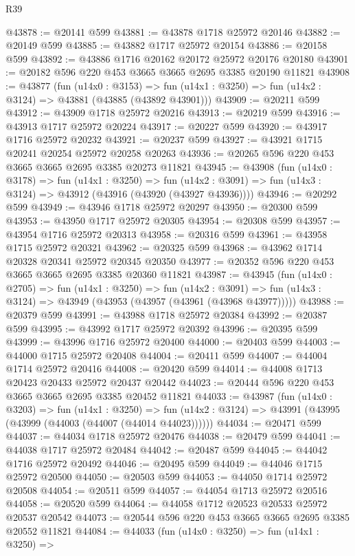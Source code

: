 \begin{lexlean}{R39}
\begin{coremodule}
@43878 := @20141 @599
@43881 := @43878 @1718 @25972 @20146
@43882 := @20149 @599
@43885 := @43882 @1717 @25972 @20154
@43886 := @20158 @599
@43892 := @43886 @1716 @20162 @20172 @25972 @20176 @20180
@43901 := @20182 @596 @220 @453 @3665 @3665 @2695 @3385 @20190 @11821
@43908 := @43877
    (fun (u14x0 : @3153) =>
    fun (u14x1 : @3250) => fun (u14x2 : @3124) => @43881 (@43885 (@43892 @43901)))
@43909 := @20211 @599
@43912 := @43909 @1718 @25972 @20216
@43913 := @20219 @599
@43916 := @43913 @1717 @25972 @20224
@43917 := @20227 @599
@43920 := @43917 @1716 @25972 @20232
@43921 := @20237 @599
@43927 := @43921 @1715 @20241 @20254 @25972 @20258 @20263
@43936 := @20265 @596 @220 @453 @3665 @3665 @2695 @3385 @20273 @11821
@43945 := @43908
    (fun (u14x0 : @3178) =>
    fun (u14x1 : @3250) =>
    fun (u14x2 : @3091) => fun (u14x3 : @3124) => @43912 (@43916 (@43920 (@43927 @43936))))
@43946 := @20292 @599
@43949 := @43946 @1718 @25972 @20297
@43950 := @20300 @599
@43953 := @43950 @1717 @25972 @20305
@43954 := @20308 @599
@43957 := @43954 @1716 @25972 @20313
@43958 := @20316 @599
@43961 := @43958 @1715 @25972 @20321
@43962 := @20325 @599
@43968 := @43962 @1714 @20328 @20341 @25972 @20345 @20350
@43977 := @20352 @596 @220 @453 @3665 @3665 @2695 @3385 @20360 @11821
@43987 := @43945
    (fun (u14x0 : @2705) =>
    fun (u14x1 : @3250) =>
    fun (u14x2 : @3091) => fun (u14x3 : @3124) => @43949 (@43953 (@43957 (@43961 (@43968 @43977)))))
@43988 := @20379 @599
@43991 := @43988 @1718 @25972 @20384
@43992 := @20387 @599
@43995 := @43992 @1717 @25972 @20392
@43996 := @20395 @599
@43999 := @43996 @1716 @25972 @20400
@44000 := @20403 @599
@44003 := @44000 @1715 @25972 @20408
@44004 := @20411 @599
@44007 := @44004 @1714 @25972 @20416
@44008 := @20420 @599
@44014 := @44008 @1713 @20423 @20433 @25972 @20437 @20442
@44023 := @20444 @596 @220 @453 @3665 @3665 @2695 @3385 @20452 @11821
@44033 := @43987
    (fun (u14x0 : @3203) =>
    fun (u14x1 : @3250) =>
    fun (u14x2 : @3124) => @43991 (@43995 (@43999 (@44003 (@44007 (@44014 @44023))))))
@44034 := @20471 @599
@44037 := @44034 @1718 @25972 @20476
@44038 := @20479 @599
@44041 := @44038 @1717 @25972 @20484
@44042 := @20487 @599
@44045 := @44042 @1716 @25972 @20492
@44046 := @20495 @599
@44049 := @44046 @1715 @25972 @20500
@44050 := @20503 @599
@44053 := @44050 @1714 @25972 @20508
@44054 := @20511 @599
@44057 := @44054 @1713 @25972 @20516
@44058 := @20520 @599
@44064 := @44058 @1712 @20523 @20533 @25972 @20537 @20542
@44073 := @20544 @596 @220 @453 @3665 @3665 @2695 @3385 @20552 @11821
@44084 := @44033
    (fun (u14x0 : @3250) =>
    fun (u14x1 : @3250) =>

\end{coremodule}
\end{lexlean}
